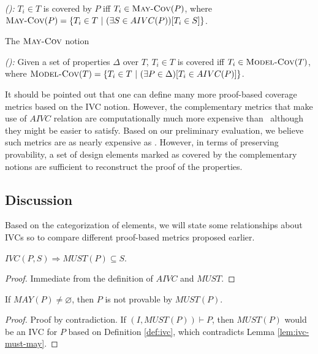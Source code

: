 \begin{definition} {\emph{(\maycov):}}
  \label{def:comp-1}
 $T_i \in T$ is covered by $P$ iff $T_i \in \text{\sc May-Cov} (P)$, where
   $\text{\sc May-Cov} (P) = \{T_i \in T ~|~ (\exists S \in AIVC(P))[T_i \in S] \}$.
\end{definition}

The $\text{\sc May-Cov}$ notion 

\begin{definition} {\emph{(\allcov):}}
  \label{def:comp-2}
     Given a set of properties $\Delta$ over $T$, $T_i \in T$ is covered
   iff $T_i \in \text{\sc Model-Cov} (T)$, where
   $\text{\sc Model-Cov} (T) = \{T_i \in T ~|~ (\exists P \in \Delta)[T_i \in AIVC(P)] \}$.
\end{definition}

It should be pointed out that one can define many more proof-based coverage metrics based on the IVC notion. However, the complementary metrics that make use of $AIVC$ relation are computationally much more expensive than \ivccov\ although they might be easier to satisfy. Based on our preliminary evaluation, we believe such metrics are as nearly expensive as \nondetcov. However, in terms of preserving provability, a set of design elements marked as covered by the complementary notions are
sufficient to reconstruct the proof of the properties.


\subsection{Discussion}
\label{subsec:method-disc}


Based on the categorization of elements, we will state some relationships about IVCs so to compare different proof-based metrics proposed earlier.

\begin{lemma}
  \label{lem:ivc-must-may}
 $IVC(P, S) \Rightarrow  MUST(P) \subseteq S$.
\end{lemma}
\begin{proof}
 Immediate from the definition of $AIVC$ and $MUST$.
\end{proof}
\vspace{2mm}

\begin{lemma}
  \label{lem:must-not-enough}
  If $MAY(P) \neq \varnothing$, then $P$ is not provable by $MUST(P)$.
\end{lemma}
\begin{proof}
  Proof by contradiction. If $(I, MUST(P)) \vdash P$, then $MUST(P)$
  would be an IVC for $P$ based on Definition \ref{def:ivc},
  which contradicts Lemma \ref{lem:ivc-must-may}.
\end{proof}
\vspace{2mm}

